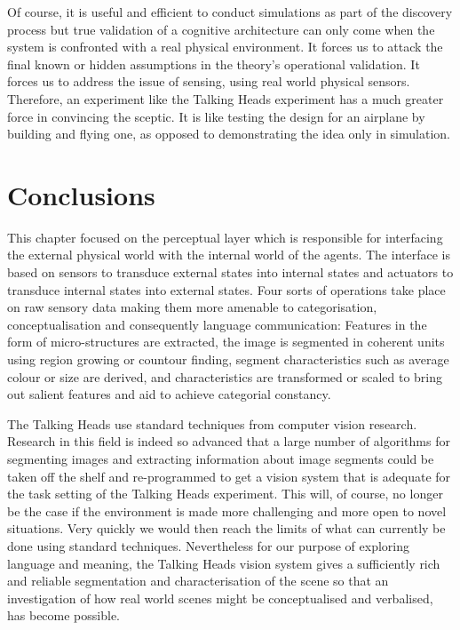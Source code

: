 Of course, it is useful and efficient to 
conduct simulations as part of the discovery process 
but true validation of a cognitive architecture 
can only come when 
the system is confronted with a real physical environment. 
It forces us to attack the final known or hidden 
assumptions in the theory's operational validation. It
forces us to address the issue of sensing, using
real world physical sensors. Therefore, an experiment 
like the Talking Heads experiment has
a much greater force in 
convincing the sceptic. It is like testing the design 
for an airplane by building and flying one, as opposed
to demonstrating the idea only in simulation. 

\section{Conclusions}

This chapter focused on the perceptual layer which 
is responsible for interfacing the external physical 
world with the internal world of the agents. The 
interface is based on sensors to transduce external states
into internal states and actuators to transduce internal states into
external states. Four sorts of operations take place 
on raw sensory data making them more amenable to 
categorisation, conceptualisation and consequently 
language communication: Features in the 
form of micro-structures are extracted, the image is 
segmented in coherent units using region growing or 
countour finding, segment characteristics such as 
average colour or size are derived, and characteristics 
are transformed or scaled to bring out salient 
features and aid to achieve categorial constancy. 

The Talking Heads use 
standard techniques from computer vision research. Research
in this field is indeed so advanced that a large number 
of algorithms for segmenting images and extracting information about
image segments could be taken off the shelf and re-programmed to get 
a vision system that is adequate for the task setting 
of the Talking Heads experiment. This will, of course, no 
longer be the case if the environment is made more challenging
and more open to novel situations. Very quickly we would 
then reach the limits of what can currently be done using
standard techniques. Nevertheless for our purpose of 
exploring language and meaning, the Talking Heads 
vision system gives 
a sufficiently rich and reliable segmentation and 
characterisation of the scene so that an investigation
of how real world scenes might be conceptualised and 
verbalised, has become possible. 

